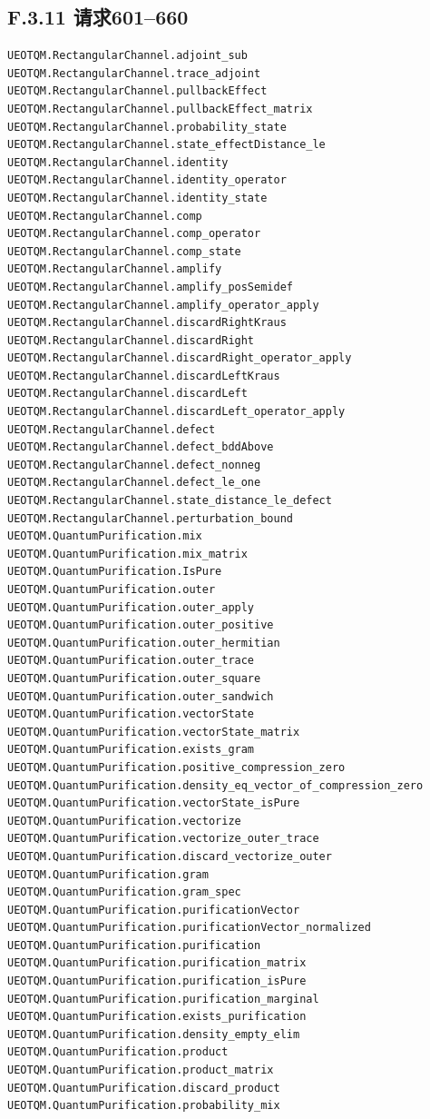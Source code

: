 \documentclass[
  11pt,
  oneside]{book}
\begin{document}
\subsection{F.3.11 请求601--660}

\begin{Verbatim}[breaklines,breakanywhere,fontsize=\scriptsize]
UEOTQM.RectangularChannel.adjoint_sub
UEOTQM.RectangularChannel.trace_adjoint
UEOTQM.RectangularChannel.pullbackEffect
UEOTQM.RectangularChannel.pullbackEffect_matrix
UEOTQM.RectangularChannel.probability_state
UEOTQM.RectangularChannel.state_effectDistance_le
UEOTQM.RectangularChannel.identity
UEOTQM.RectangularChannel.identity_operator
UEOTQM.RectangularChannel.identity_state
UEOTQM.RectangularChannel.comp
UEOTQM.RectangularChannel.comp_operator
UEOTQM.RectangularChannel.comp_state
UEOTQM.RectangularChannel.amplify
UEOTQM.RectangularChannel.amplify_posSemidef
UEOTQM.RectangularChannel.amplify_operator_apply
UEOTQM.RectangularChannel.discardRightKraus
UEOTQM.RectangularChannel.discardRight
UEOTQM.RectangularChannel.discardRight_operator_apply
UEOTQM.RectangularChannel.discardLeftKraus
UEOTQM.RectangularChannel.discardLeft
UEOTQM.RectangularChannel.discardLeft_operator_apply
UEOTQM.RectangularChannel.defect
UEOTQM.RectangularChannel.defect_bddAbove
UEOTQM.RectangularChannel.defect_nonneg
UEOTQM.RectangularChannel.defect_le_one
UEOTQM.RectangularChannel.state_distance_le_defect
UEOTQM.RectangularChannel.perturbation_bound
UEOTQM.QuantumPurification.mix
UEOTQM.QuantumPurification.mix_matrix
UEOTQM.QuantumPurification.IsPure
UEOTQM.QuantumPurification.outer
UEOTQM.QuantumPurification.outer_apply
UEOTQM.QuantumPurification.outer_positive
UEOTQM.QuantumPurification.outer_hermitian
UEOTQM.QuantumPurification.outer_trace
UEOTQM.QuantumPurification.outer_square
UEOTQM.QuantumPurification.outer_sandwich
UEOTQM.QuantumPurification.vectorState
UEOTQM.QuantumPurification.vectorState_matrix
UEOTQM.QuantumPurification.exists_gram
UEOTQM.QuantumPurification.positive_compression_zero
UEOTQM.QuantumPurification.density_eq_vector_of_compression_zero
UEOTQM.QuantumPurification.vectorState_isPure
UEOTQM.QuantumPurification.vectorize
UEOTQM.QuantumPurification.vectorize_outer_trace
UEOTQM.QuantumPurification.discard_vectorize_outer
UEOTQM.QuantumPurification.gram
UEOTQM.QuantumPurification.gram_spec
UEOTQM.QuantumPurification.purificationVector
UEOTQM.QuantumPurification.purificationVector_normalized
UEOTQM.QuantumPurification.purification
UEOTQM.QuantumPurification.purification_matrix
UEOTQM.QuantumPurification.purification_isPure
UEOTQM.QuantumPurification.purification_marginal
UEOTQM.QuantumPurification.exists_purification
UEOTQM.QuantumPurification.density_empty_elim
UEOTQM.QuantumPurification.product
UEOTQM.QuantumPurification.product_matrix
UEOTQM.QuantumPurification.discard_product
UEOTQM.QuantumPurification.probability_mix
\end{Verbatim}
\end{document}
